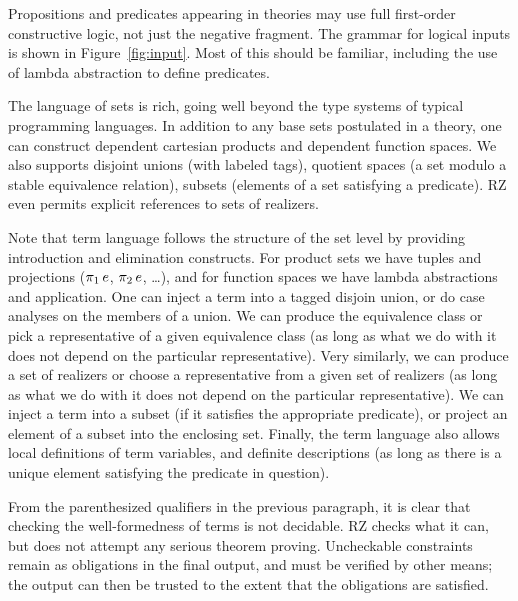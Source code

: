Propositions and predicates appearing in theories may use full
first-order constructive logic, not just the negative fragment. The
grammar for logical inputs is shown in Figure~\ref{fig:input}. Most of
this should be familiar, including the use of lambda abstraction to
define predicates.

The language of sets is rich, going well beyond the type systems of
typical programming languages. In addition to any base sets postulated
in a theory, one can construct dependent cartesian products and
dependent function spaces. We also supports disjoint unions (with
labeled tags), quotient spaces (a set modulo a stable equivalence
relation), subsets (elements of a set satisfying a predicate). RZ even
permits explicit references to sets of realizers.
\fi

Note that term language follows the structure of the set level by providing
introduction and elimination constructs. For product sets we have
tuples and projections ($\mathop{\pi_{1}} e$, $\mathop{\pi_{2}} e$, \ldots),
and for function spaces we have lambda abstractions and application.
One can inject a term into a tagged disjoin union, or do case analyses
on the members of a union. We can produce the equivalence class or pick a representative of a given equivalence class (as
long as what we do with it does not depend on the particular
representative). Very similarly, we can produce a set of realizers
or choose a representative from a given set of realizers
(as long as what we do with it does not depend on the particular
representative). We can inject a term into a subset (if it satisfies
the appropriate predicate), or project an element of a subset into the
enclosing set. Finally, the term language also allows local
definitions of term variables, and definite descriptions (as long as
there is a unique element satisfying the predicate in question).

From the parenthesized qualifiers in the previous paragraph, it is
clear that checking the well-formedness of terms is not decidable. RZ
checks what it can, but does not attempt any serious theorem proving.
Uncheckable constraints remain as obligations
in the final output, and must be verified by other means; the output
can then be trusted to the extent that the obligations are satisfied.


